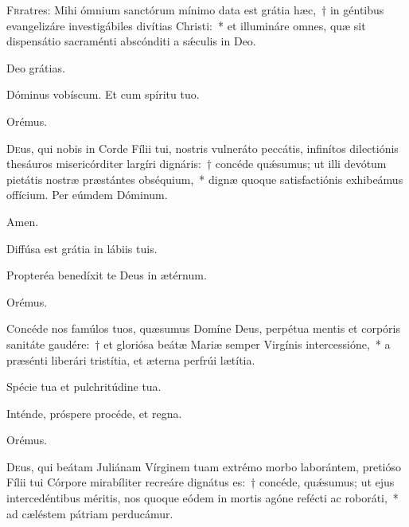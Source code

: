 
\lettrine{F}{r}ratres: Mihi ómnium sanctórum mínimo data est grátia hæc,~† in géntibus evangelizáre investigábiles divítias Christi:~* et illumináre omnes, quæ sit dispensátio sacraménti abscónditi a sǽculis in Deo.

\rr Deo grátias.

\hymnus
   

   \admagnificat
   
    
    
  
  
  \vv Dóminus vobíscum. \rr Et cum spíritu tuo.
  
  \oratio
  
  Orémus.
  
  \lettrine{D}{e}us, qui nobis in Corde Fílii tui, nostris vulneráto peccátis, infinítos dilectiónis thesáuros misericórditer largíri dignáris:~† concéde quǽsumus; ut illi devótum pietátis nostræ præstántes obséquium,~* dignæ quoque satisfactiónis exhibeámus offícium. Per eúmdem Dóminum.
  
  \rr Amen.
  
 
 \vv Diffúsa est grátia in lábiis tuis.

\rr Propteréa benedíxit te Deus in ætérnum.

  Orémus.
  
  \lettrine{C}{o}ncéde nos famúlos tuos, quæsumus Domíne Deus, perpétua mentis et corpóris sanitáte gaudére:~† et gloriósa beátæ Mariæ semper Virgínis intercessióne,~* a præsénti liberári tristítia, et æterna perfrúi lætítia.
  

\vv Spécie tua et pulchritúdine tua.

\rr Inténde, próspere procéde, et regna.

Orémus.

\lettrine{D}{e}us, qui beátam Juliánam Vírginem tuam extrémo morbo laborántem, pretióso Fílii tui Córpore mirabíliter recreáre dignátus es:~† concéde, quǽsumus; ut ejus intercedéntibus méritis, nos quoque eódem in mortis agóne refécti ac roboráti,~* ad cæléstem pátriam perducámur.

